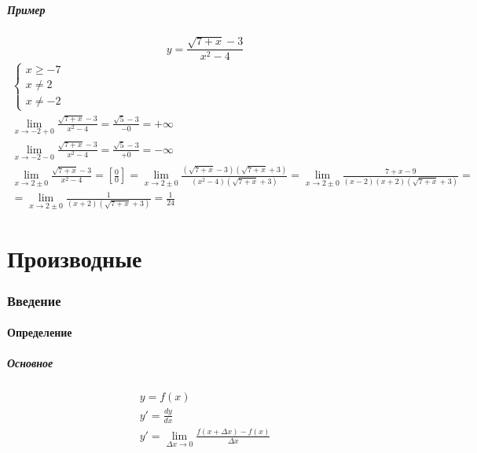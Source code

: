 \documentclass{article}
\begin{document}
\subsubsection{Пример}
\[
    y = \frac{\sqrt{7 + x} - 3}{x^2 - 4}
\]
\begin{gather*}
    \begin{cases}
        x \ge -7 \\
        x \neq 2 \\
        x \neq -2
    \end{cases} \\
    \lim_{x \to -2 + 0} \frac{\sqrt{7 + x} - 3}{x^2 - 4} =
    \frac{\sqrt{5} - 3}{-0} = +\infty \\
    \lim_{x \to -2 - 0} \frac{\sqrt{7 + x} - 3}{x^2 - 4} =
    \frac{\sqrt{5} - 3}{+0} = -\infty \\
    \lim_{x \to 2 \pm 0} \frac{\sqrt{7 + x} - 3}{x^2 - 4} =
    \left[ \frac{0}{0} \right] =
    \lim_{x \to 2 \pm 0} \frac{(\sqrt{7 + x} - 3)(\sqrt{7 + x} + 3)}{(x^2 - 4)(\sqrt{7 + x} + 3)} =
    \lim_{x \to 2 \pm 0} \frac{7 + x - 9}{(x - 2)(x + 2)(\sqrt{7 + x} + 3)} = \\
    = \lim_{x \to 2 \pm 0} \frac{1}{(x + 2)(\sqrt{7 + x} + 3)} = 
    \frac{1}{24}
\end{gather*}




\newpage
\part{Производные}

\section{Введение}

\subsection{Определение}

\subsubsection{Основное}
\begin{gather*}
    y = f(x) \\
    y' = \frac{dy}{dx} \\
    y' = \lim_{\Delta x \to 0} \frac{f(x + \Delta x) - f(x)}{\Delta x}
\end{gather*}
\end{document}
